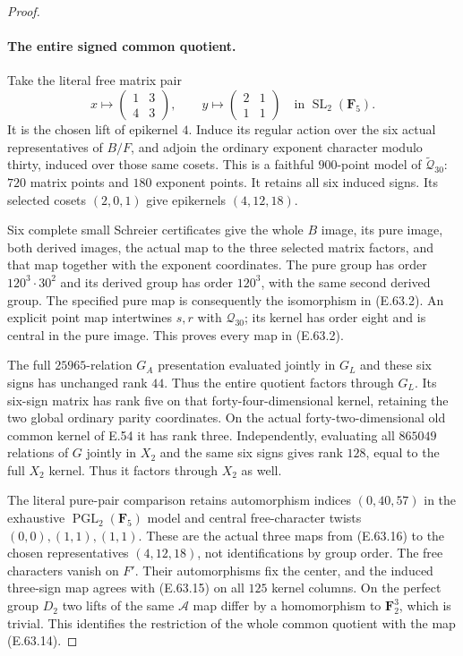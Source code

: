 \begin{proof}
\paragraph{The entire signed common quotient.}
Take the literal free matrix pair
\[
 x\longmapsto\begin{pmatrix}1&3\\4&3\end{pmatrix},
 \qquad
 y\longmapsto\begin{pmatrix}2&1\\1&1\end{pmatrix}
          \quad\text{in }\operatorname{SL}_2(\mathbf F_5).
 \tag{E.63.16}
\]
It is the chosen lift of epikernel $4$. Induce its
regular action over the six actual representatives
of $B/F$, and adjoin the ordinary exponent character
modulo thirty, induced over those same cosets.
This is a faithful $900$-point model of
$\widetilde{\mathcal Q}_{30}$: $720$ matrix points and
$180$ exponent points. It retains all six induced
signs. Its selected cosets $(2,0,1)$ give epikernels
$(4,12,18)$.

Six complete small Schreier certificates give the
whole $B$ image, its pure image, both derived images,
the actual map to the three selected matrix factors,
and that map together with the exponent coordinates.
The pure group has order $120^3\cdot30^2$ and its
derived group has order $120^3$, with the same second
derived group. The specified pure map is consequently
the isomorphism in \textup{(E.63.2)}. An explicit
point map intertwines $s,r$ with $\mathcal Q_{30}$;
its kernel has order eight and is central in the pure
image. This proves every map in \textup{(E.63.2)}.

The full $25965$-relation $G_A$ presentation evaluated
jointly in $G_L$ and these six signs has unchanged
rank $44$. Thus the entire quotient factors through
$G_L$. Its six-sign matrix has rank five on that
forty-four-dimensional kernel, retaining the two
global ordinary parity coordinates. On the actual
forty-two-dimensional old common kernel of E.54 it
has rank three. Independently, evaluating all
$865049$ relations of $G$ jointly in $X_2$ and the
same six signs gives rank $128$, equal to the full
$X_2$ kernel. Thus it factors through $X_2$ as well.

The literal pure-pair comparison retains automorphism
indices $(0,40,57)$ in the exhaustive
$\operatorname{PGL}_2(\mathbf F_5)$ model and central
free-character twists $(0,0),(1,1),(1,1)$. These are
the actual three maps from \textup{(E.63.16)} to the
chosen representatives $(4,12,18)$, not identifications
by group order. The free characters vanish on $F'$.
Their automorphisms fix the center, and the induced
three-sign map agrees with \textup{(E.63.15)} on
all $125$ kernel columns. On the perfect group $D_2$
two lifts of the same $\mathcal A$ map differ by a
homomorphism to $\mathbf F_2^3$, which is trivial.
This identifies the restriction of the whole common
quotient with the map \textup{(E.63.14)}.


\end{proof}
